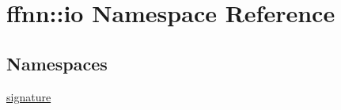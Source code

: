 \hypertarget{namespaceffnn_1_1io}{\section{ffnn\-:\-:io Namespace Reference}
\label{namespaceffnn_1_1io}
}
\subsection*{Namespaces}
\begin{DoxyCompactItemize}
\item 
\hyperlink{namespaceffnn_1_1io_1_1signature}{signature}
\end{DoxyCompactItemize}
